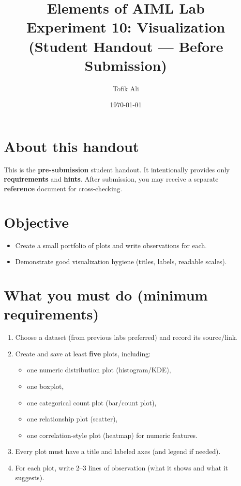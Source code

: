 \documentclass[11pt]{article}
\title{Elements of AIML Lab\\Experiment 10: Visualization (Student Handout — Before Submission)}
\author{Tofik Ali}
\date{\today}
\begin{document}
\maketitle
\tableofcontents

\section{About this handout}
This is the \textbf{pre-submission} student handout.
It intentionally provides only \textbf{requirements} and \textbf{hints}.
After submission, you may receive a separate \textbf{reference} document for cross-checking.

\section{Objective}
\begin{itemize}[leftmargin=*]
  \item Create a small portfolio of plots and write observations for each.
  \item Demonstrate good visualization hygiene (titles, labels, readable scales).
\end{itemize}

\section{What you must do (minimum requirements)}
\begin{enumerate}[leftmargin=*]
  \item Choose a dataset (from previous labs preferred) and record its source/link.
  \item Create and save at least \textbf{five} plots, including:
  \begin{itemize}[leftmargin=*]
    \item one numeric distribution plot (histogram/KDE),
    \item one boxplot,
    \item one categorical count plot (bar/count plot),
    \item one relationship plot (scatter),
    \item one correlation-style plot (heatmap) for numeric features.
  \end{itemize}
  \item Every plot must have a title and labeled axes (and legend if needed).
  \item For each plot, write 2--3 lines of observation (what it shows and what it suggests).
\end{enumerate}
\end{document}
